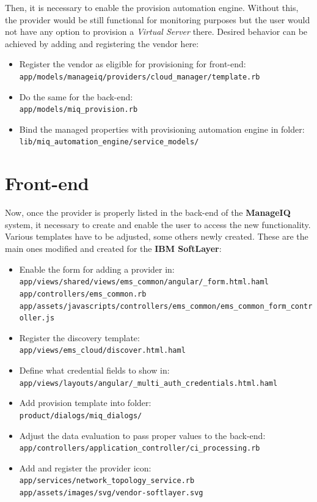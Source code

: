 Then, it is necessary to enable the provision automation engine. Without this, the provider would be still functional for monitoring purposes but the user would not have any option to provision a \emph{Virtual Server} there. Desired behavior can be achieved by adding and registering the vendor here:

\begin{itemize}
	\item Register the vendor as eligible for provisioning for front-end: \\
	\small{\verb|app/models/manageiq/providers/cloud_manager/template.rb|}
	\item Do the same for the back-end: \\
	\small{\verb|app/models/miq_provision.rb|}
	\item Bind the managed properties with provisioning automation engine in folder: \\
	\small{\verb|lib/miq_automation_engine/service_models/|}
\end{itemize}

\section{Front-end}
\label{sec:Front-end}

Now, once the provider is properly listed in the back-end of the \textbf{ManageIQ} system, it necessary to create and enable the user to access the new functionality. Various templates have to be adjusted, some others newly created. These are the main ones modified and created for the \textbf{IBM SoftLayer}:

\begin{itemize}
	\item Enable the form for adding a provider in:\\
	\small{\verb|app/views/shared/views/ems_common/angular/_form.html.haml| \\
		\verb|app/controllers/ems_common.rb| \\
		\verb|app/assets/javascripts/controllers/ems_common/ems_common_form_controller.js|}
	\item Register the discovery template: \\
	\small{\verb|app/views/ems_cloud/discover.html.haml|}
	\item Define what credential fields to show in: \\
	\small{\verb|app/views/layouts/angular/_multi_auth_credentials.html.haml|}
	\item Add provision template into folder: \\
	\small{\verb|product/dialogs/miq_dialogs/|}
	\item Adjust the data evaluation to pass proper values to the back-end: \\
	\small{\verb|app/controllers/application_controller/ci_processing.rb|}
	\item Add and register the provider icon: \\
	\small{\verb|app/services/network_topology_service.rb| \\
		\verb|app/assets/images/svg/vendor-softlayer.svg|}
\end{itemize}


